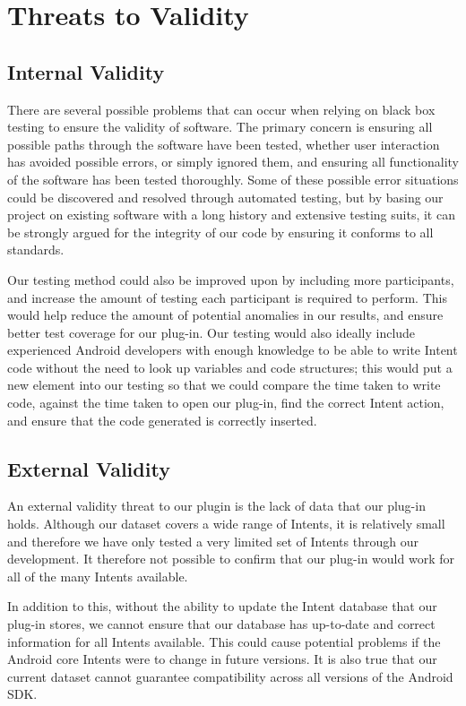 \section{Threats to Validity}
\label{threatstovalidity}

\subsection{Internal Validity}
There are several possible problems that can occur when relying on black box testing to ensure the validity of software. The primary concern is ensuring all possible paths through the software have been tested, whether user interaction has avoided possible errors, or simply ignored them, and ensuring all functionality of the software has been tested thoroughly. Some of these possible error situations could be discovered and resolved through automated testing, but by basing our project on existing software with a long history and extensive testing suits, it can be strongly argued for the integrity of our code by ensuring it conforms to all standards.

Our testing method could also be improved upon by including more participants, and increase the amount of testing each participant is required to perform. This would help reduce the amount of potential anomalies in our results, and ensure better test coverage for our plug-in. Our testing would also ideally include experienced Android developers with enough knowledge to be able to write Intent code without the need to look up variables and code structures; this would put a new element into our testing so that we could compare the time taken to write code, against the time taken to open our plug-in, find the correct Intent action, and ensure that the code generated is correctly inserted.


\subsection{External Validity}

An external validity threat to our plugin is the lack of data that our plug-in holds. Although our dataset covers a wide range of Intents, it is relatively small and therefore we have only tested a very limited set of Intents through our development. It therefore not possible to confirm that our plug-in would work for all of the many Intents available.

In addition to this, without the ability to update the Intent database that our plug-in stores, we cannot ensure that our database has up-to-date and correct information for all Intents available. This could cause potential problems if the Android core Intents were to change in future versions. It is also true that our current dataset cannot guarantee compatibility across all versions of the Android SDK.